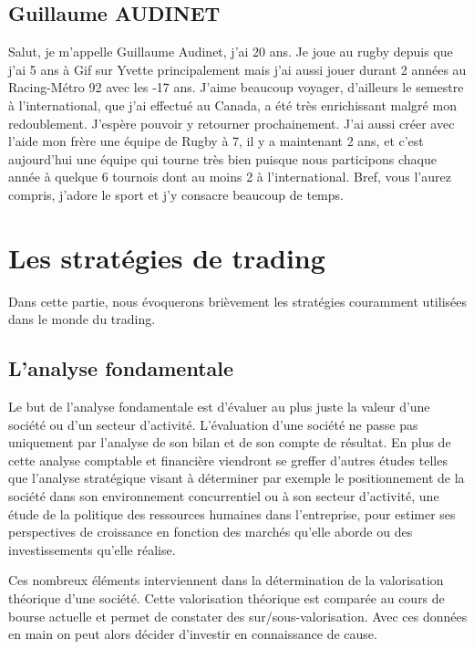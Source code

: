 \documentclass[a4paper,12pt]{article}
\begin{document}
\subsection{Guillaume AUDINET}

Salut, je m'appelle Guillaume Audinet, j'ai 20 ans. Je joue au rugby depuis que j'ai 5 ans à Gif sur Yvette principalement mais j'ai aussi jouer durant 2 années au Racing-Métro 92 avec les -17 ans. J'aime beaucoup voyager, d'ailleurs le semestre à l'international, que j'ai effectué au Canada, a été très enrichissant malgré mon redoublement. J'espère pouvoir y retourner prochainement.
J'ai aussi créer avec l'aide mon frère une équipe de Rugby à 7, il y a maintenant 2 ans, et c'est aujourd'hui une équipe qui tourne très bien puisque nous participons chaque année à quelque 6 tournois dont au moins 2 à l'international.
Bref, vous l'aurez compris, j'adore le sport et j'y consacre beaucoup de temps.

\newpage

\section{Les stratégies de trading}

Dans cette partie, nous évoquerons brièvement les stratégies couramment utilisées dans le monde du trading. 

\subsection{L'analyse fondamentale}
Le but de l'analyse fondamentale est d'évaluer au plus juste la valeur d'une société ou d'un secteur d'activité. L'évaluation d'une société ne passe pas uniquement par l'analyse de son bilan et de son compte de résultat. En plus de cette analyse comptable et financière viendront se greffer d'autres études telles que l'analyse stratégique visant à déterminer par exemple le positionnement de la société dans son environnement concurrentiel ou à son secteur d'activité, une étude de la politique des ressources humaines dans l'entreprise, pour estimer ses perspectives de croissance en fonction des marchés qu'elle aborde ou des investissements qu'elle réalise. 

Ces nombreux éléments interviennent dans la détermination de la valorisation théorique d'une société. Cette valorisation théorique est comparée au cours de bourse actuelle et permet de constater des sur/sous-valorisation. Avec ces données en main on peut alors décider d'investir en connaissance de cause. 
\end{document}

